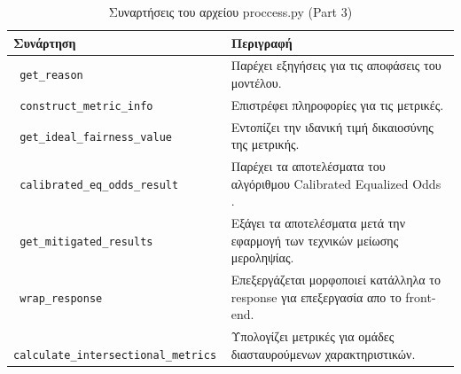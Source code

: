 \documentclass[12pt,twoside]{article}
\newcommand{\en}{\selectlanguage{english}}
\newcommand{\gr}{\selectlanguage{greek}}
\begin{document}
\newpage
\begin{table}[H]
\centering
\caption{\gr Συναρτήσεις του αρχείου \en proccess.py (Part 3)}
\begin{tabular}{|p{7cm}|p{7cm}|}
\hline
\textbf{\gr Συνάρτηση} & \textbf{\gr Περιγραφή} \\ \hline
\texttt{ \en get\_reason} & \gr Παρέχει εξηγήσεις για τις αποφάσεις του μοντέλου. \\ \hline
\texttt{ \en construct\_metric\_info} & \gr Επιστρέφει πληροφορίες για τις μετρικές. \\ \hline
\texttt{ \en get\_ideal\_fairness\_value} & \gr Εντοπίζει την ιδανική τιμή δικαιοσύνης της μετρικής. \\ \hline
\texttt{ \en calibrated\_eq\_odds\_result} & \gr Παρέχει τα αποτελέσματα του αλγόριθμου \en Calibrated Equalized Odds \gr. \\ \hline
\texttt{ \en get\_mitigated\_results} & \gr Εξάγει τα αποτελέσματα μετά την εφαρμογή των τεχνικών μείωσης μεροληψίας. \\ \hline
\texttt{ \en wrap\_response} & \gr Επεξεργάζεται μορφοποιεί κατάλληλα το \en response \gr  για επεξεργασία απο το \en front-end. \\ \hline
\texttt{ \en calculate\_intersectional\_metrics} & \gr Υπολογίζει μετρικές  για ομάδες διασταυρούμενων χαρακτηριστικών. \\ \hline
\end{tabular}
\end{table}
\end{document}
